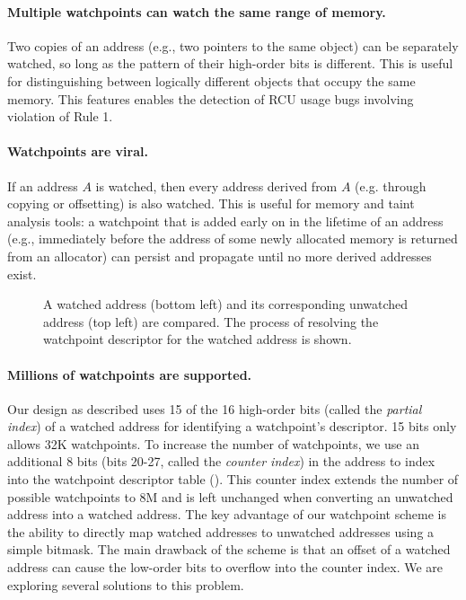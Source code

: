\paragraph{Multiple watchpoints can watch the same range of memory.} Two copies of an address (e.g., two pointers to the same object) can be separately watched, so long as the pattern of their high-order bits is different. This is useful for distinguishing between logically different objects that occupy the same memory. This features enables the detection of RCU usage bugs involving violation of Rule 1. %
	
\paragraph{Watchpoints are viral.} If an address $A$ is watched, then every address derived from $A$ (e.g. through copying or offsetting) is also watched. This is useful for memory and taint analysis tools: a watchpoint that is added early on in the lifetime of an address (e.g., immediately before the address of some newly allocated memory is returned from an allocator) can persist and propagate until no more derived addresses exist.

\begin{figure}[t]
\begin{center}
\end{center}
\caption{\label{fig:watchpoint_descriptor_table}A watched address (bottom left) and its corresponding unwatched address (top left) are compared. The process of resolving the watchpoint descriptor for the watched address is shown.}
\end{figure}

\paragraph{Millions of watchpoints are supported.} Our design as described uses 15 of the 16 high-order bits (called the \emph{partial index}) of a watched address for identifying a watchpoint's descriptor. 15 bits only allows 32K watchpoints. To increase the number of watchpoints, we use an additional 8 bits (bits 20-27, called the \emph{counter index}) in the address to index into the watchpoint descriptor table (). This counter index extends the number of possible watchpoints to 8M and is left unchanged when converting an unwatched address into a watched address. The key advantage of our watchpoint scheme is the ability to directly map watched addresses to unwatched addresses using a simple bitmask. The main drawback of the scheme is that an offset of a watched address can cause the low-order bits to overflow into the counter index. We are exploring several solutions to this problem.

